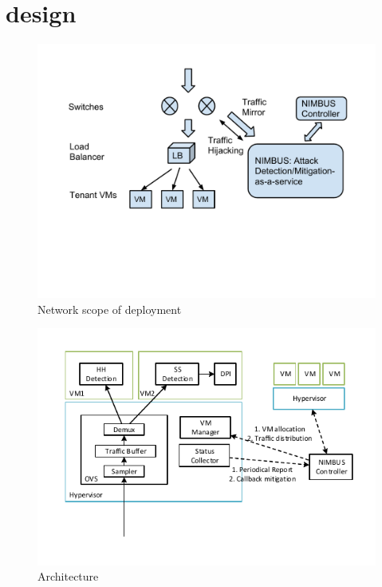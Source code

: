 \section{design}

\begin{figure}[t!]
 \centering
\includegraphics[width=\linewidth]{figs/scope.pdf}
\vspace{-0.82in}
\caption{\small Network scope of \nimbus deployment}
\vspace{-0.0in}
\label{fig:scope}
\end{figure}

\begin{figure}[t!]
 \centering
\includegraphics[width=\linewidth]{figs/arch.pdf}
\vspace{-0.22in}
\caption{\small \nimbus Architecture}
\vspace{-0.2in}
\label{fig:design}
\end{figure}


